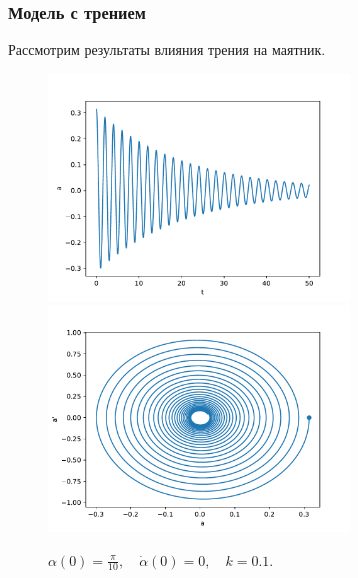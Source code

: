         \subsubsection{Модель с трением}
            Рассмотрим результаты влияния трения на маятник.
            \begin{figure}[H]
                \centering
                \includegraphics[width=8cm]{pictures/3resonance1.pdf}
                \includegraphics[width=8cm]{pictures/3resonance1p.pdf}
                \caption{$\alpha(0) = \frac{\pi}{10}, \quad \dot{\alpha}(0) = 0, \quad k = 0.1$.}
            \end{figure}
